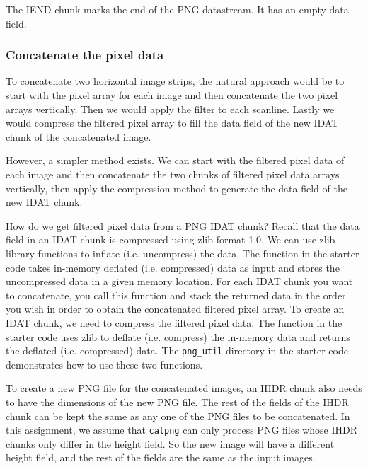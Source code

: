 The IEND chunk marks the end of the PNG datastream. It has an empty data field.

\subsubsection{Concatenate the pixel data}
To concatenate two horizontal image strips, the natural approach would be to start with the pixel array for each image and then concatenate the two pixel arrays vertically. Then we would apply the filter to each scanline. Lastly we would compress the filtered pixel array to fill the data field of the new IDAT chunk of the concatenated image.

However, a simpler method exists. We can start with the filtered pixel data of each image and then concatenate the two chunks of filtered pixel data arrays vertically, then apply the compression method to generate the data field of the new IDAT chunk.

How do we get filtered pixel data from a PNG IDAT chunk? Recall that the data field in an IDAT chunk is compressed using zlib format 1.0. We can use zlib library functions to inflate (i.e. uncompress) the data. The  function in the starter code takes in-memory deflated (i.e. compressed) data as input and stores the uncompressed data in a given memory location. For each IDAT chunk you want to concatenate, you call this function and stack the returned data in the order you wish in order to obtain the concatenated filtered pixel array. To create an IDAT chunk, we need to compress the filtered pixel data. The  function in the starter code uses zlib to deflate (i.e. compress) the in-memory data and returns the deflated (i.e. compressed) data. The \verb+png_util+ directory in the starter code demonstrates how to use these two functions.

To create a new PNG file for the concatenated images, an IHDR chunk also needs to have the dimensions of the new PNG file. The rest of the fields of the IHDR chunk can be kept the same as any one of the PNG files to be concatenated. In this assignment, we assume that \verb+catpng+ can only process PNG files whose IHDR chunks only differ in the height field. So the new image will have a different height field, and  the rest of the fields are the same as the input images.


